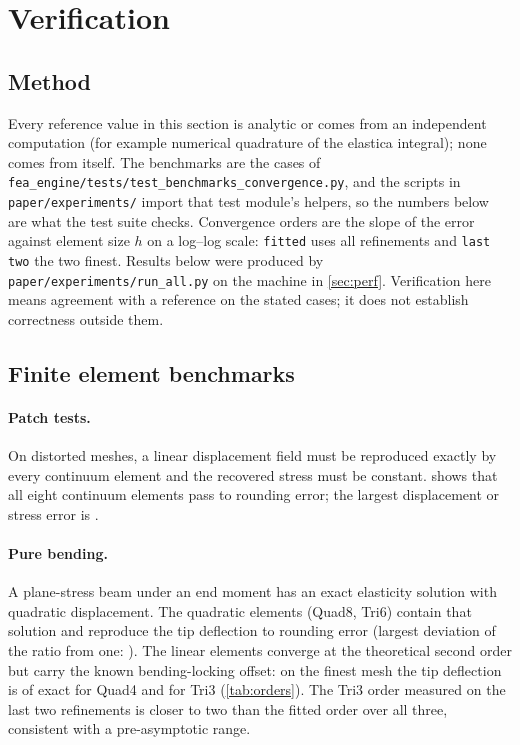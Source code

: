 \section{Verification}\label{sec:verif}

\subsection{Method}
Every reference value in this section is analytic or comes from an independent computation (for example numerical quadrature of the elastica integral); none comes from \fea{} itself. The benchmarks are the cases
of \texttt{fea\_engine/tests/test\_benchmarks\_convergence.py}, and the scripts in \texttt{paper/experiments/} import that test module's helpers, so the numbers below are what the test suite checks.
Convergence orders are the slope of the error against element size $h$ on a log--log scale: \texttt{fitted} uses all refinements and \texttt{last two} the two finest. Results below were produced by \texttt{paper/experiments/run\_all.py} on the machine in \cref{sec:perf}.
Verification here means agreement with a reference on the stated cases; it does not establish correctness outside them.

\subsection{Finite element benchmarks}
\paragraph{Patch tests.}
On distorted meshes, a linear displacement field must be reproduced exactly by every continuum element and the recovered stress must be constant.  shows that all eight continuum elements pass to rounding error; the largest displacement or stress error is \patchMaxErr{}.

\begin{table}[t]
\centering\small
\caption{Patch test on distorted meshes: relative error in displacement and in recovered stress.}\label{tab:patch}

\end{table}

\paragraph{Pure bending.}
A plane-stress beam under an end moment has an exact elasticity solution with quadratic displacement. The quadratic elements (Quad8, Tri6) contain that solution and reproduce the tip deflection to rounding error (largest deviation of the ratio from one: \quadBendingMaxErr{}).
The linear elements converge at the theoretical second order but carry the known bending-locking offset: on the finest mesh the tip deflection is \quadBendFine{} of exact for Quad4 and \triBendFine{} for Tri3 (\cref{tab:orders}). The Tri3 order measured on the last two refinements is closer to two than the fitted order over all three, consistent with a pre-asymptotic range.

